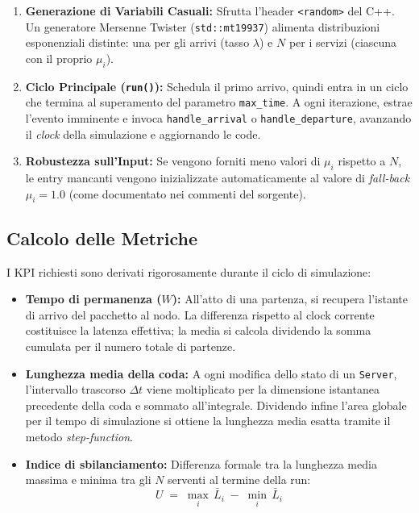 \documentclass[12pt,a4paper]{article}
\begin{document}
\begin{enumerate}
  \item \textbf{Generazione di Variabili Casuali:}
        Sfrutta l'header \texttt{<random>} del C++. Un generatore Mersenne Twister (\texttt{std::mt19937}) alimenta distribuzioni esponenziali distinte: una per gli arrivi (tasso $\lambda$) e $N$ per i servizi (ciascuna con il proprio $\mu_i$).

  \item \textbf{Ciclo Principale (\texttt{run()}):}
        Schedula il primo arrivo, quindi entra in un ciclo che termina al superamento del parametro \texttt{max\_time}. A ogni iterazione, estrae l'evento imminente e invoca \texttt{handle\_arrival} o \texttt{handle\_departure}, avanzando il \textit{clock} della simulazione e aggiornando le code.

  \item \textbf{Robustezza sull'Input:}
        Se vengono forniti meno valori di $\mu_i$ rispetto a $N$, le entry mancanti vengono inizializzate automaticamente al valore di \textit{fall-back} $\mu_i = 1.0$ (come documentato nei commenti del sorgente).
\end{enumerate}

\subsection{Calcolo delle Metriche}

I KPI richiesti sono derivati rigorosamente durante il ciclo di simulazione:

\begin{itemize}
  \item \textbf{Tempo di permanenza ($W$):}
        All'atto di una partenza, si recupera l'istante di arrivo del pacchetto al nodo. La differenza rispetto al clock corrente costituisce la latenza effettiva; la media si calcola dividendo la somma cumulata per il numero totale di partenze.

  \item \textbf{Lunghezza media della coda:}
        A ogni modifica dello stato di un \texttt{Server}, l'intervallo trascorso $\Delta t$ viene moltiplicato per la dimensione istantanea precedente della coda e sommato all'integrale. Dividendo infine l'area globale per il tempo di simulazione si ottiene la lunghezza media esatta tramite il metodo \textit{step-function}.

  \item \textbf{Indice di sbilanciamento:}
        Differenza formale tra la lunghezza media massima e minima tra gli $N$ serventi al termine della run:
        \[
          U \;=\; \max_{i}\,\bar{L}_i \;-\; \min_{i}\,\bar{L}_i
        \]
\end{itemize}
\end{document}

